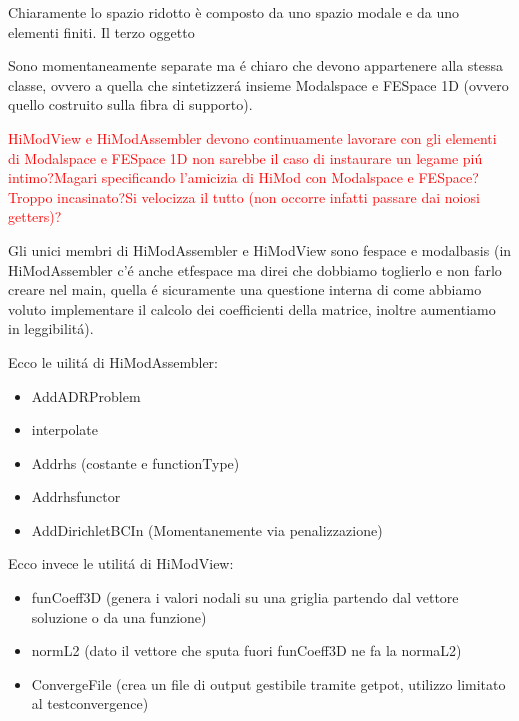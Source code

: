 Chiaramente lo spazio ridotto \`e composto da uno spazio modale e da uno elementi finiti. Il terzo oggetto 




 Sono momentaneamente separate ma \'e chiaro che devono appartenere alla stessa classe, ovvero a quella che sintetizzer\'a insieme Modalspace e FESpace 1D (ovvero quello costruito sulla fibra di supporto).
 
 \textcolor{red}{HiModView e HiModAssembler devono continuamente lavorare con gli elementi di Modalspace e FESpace 1D non sarebbe il caso di instaurare un legame pi\'u intimo?Magari specificando l'amicizia di HiMod con Modalspace e FESpace?Troppo incasinato?Si velocizza il tutto (non occorre infatti passare dai noiosi getters)?}
 
Gli unici membri di HiModAssembler e HiModView sono fespace e modalbasis (in HiModAssembler c'\'e anche etfespace ma direi che dobbiamo toglierlo e non farlo creare nel main, quella \'e sicuramente una questione interna di come abbiamo voluto implementare il calcolo dei coefficienti della matrice, inoltre aumentiamo in leggibilit\'a).

Ecco le uilit\'a di HiModAssembler:
\begin{itemize}
\item AddADRProblem
\item interpolate
\item Addrhs (costante e functionType)
\item Addrhsfunctor
\item AddDirichletBCIn (Momentanemente via penalizzazione)
\end{itemize}

Ecco invece le utilit\'a di HiModView:
\begin{itemize}
\item funCoeff3D (genera i valori nodali su una griglia partendo dal vettore soluzione o da una funzione)
\item normL2 (dato il vettore che sputa fuori funCoeff3D ne fa la normaL2)
\item ConvergeFile (crea un file di output gestibile tramite getpot, utilizzo limitato al testconvergence)
\end{itemize}





